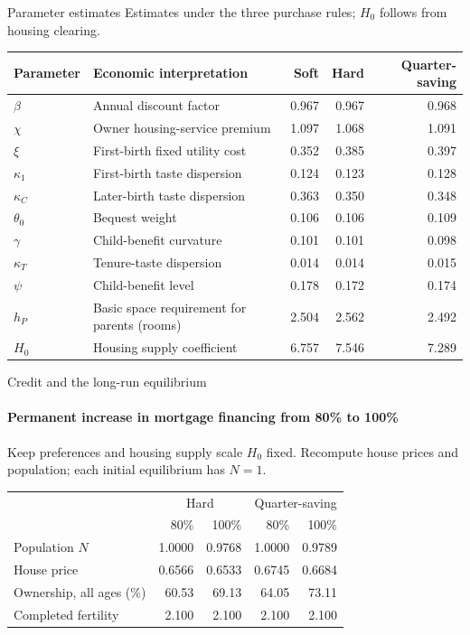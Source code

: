 \documentclass[11pt,aspectratio=169]{beamer}
\begin{document}
\begin{frame}{Parameter estimates}
\small
Estimates under the three purchase rules; $H_0$ follows from housing clearing.
\medskip
\fontsize{8.7}{9.4}\selectfont
\begin{center}
{\setlength{\tabcolsep}{4pt}
\begin{tabular}{llrrr}
\toprule
Parameter & Economic interpretation & Soft & Hard & Quarter-saving \\
\midrule
$\beta$ & Annual discount factor & 0.967 & 0.967 & 0.968 \\
$\chi$ & Owner housing-service premium & 1.097 & 1.068 & 1.091 \\
$\xi$ & First-birth fixed utility cost & 0.352 & 0.385 & 0.397 \\
$\kappa_1$ & First-birth taste dispersion & 0.124 & 0.123 & 0.128 \\
$\kappa_C$ & Later-birth taste dispersion & 0.363 & 0.350 & 0.348 \\
$\theta_0$ & Bequest weight & 0.106 & 0.106 & 0.109 \\
$\gamma$ & Child-benefit curvature & 0.101 & 0.101 & 0.098 \\
$\kappa_T$ & Tenure-taste dispersion & 0.014 & 0.014 & 0.015 \\
$\psi$ & Child-benefit level & 0.178 & 0.172 & 0.174 \\
$h_P$ & Basic space requirement for parents (rooms) & 2.504 & 2.562 & 2.492 \\
$H_0$ & Housing supply coefficient & 6.757 & 7.546 & 7.289 \\
\bottomrule
\end{tabular}
}
\end{center}
\end{frame}

\begin{frame}{Credit and the long-run equilibrium}
\framesubtitle{Permanent increase in mortgage financing from 80\% to 100\%}
\small
Keep preferences and housing supply scale $H_0$ fixed. Recompute house prices and population; each initial equilibrium has $N=1$.
\begin{center}
\begin{tabular}{lrrrr}
\toprule
 & \multicolumn{2}{c}{Hard} & \multicolumn{2}{c}{Quarter-saving} \\
 & 80\% & 100\% & 80\% & 100\% \\
\midrule
Population $N$ & 1.0000 & 0.9768 & 1.0000 & 0.9789 \\
House price & 0.6566 & 0.6533 & 0.6745 & 0.6684 \\
Ownership, all ages (\%) & 60.53 & 69.13 & 64.05 & 73.11 \\
Completed fertility & 2.100 & 2.100 & 2.100 & 2.100 \\
\bottomrule
\end{tabular}
\end{center}
\end{frame}
\end{document}
